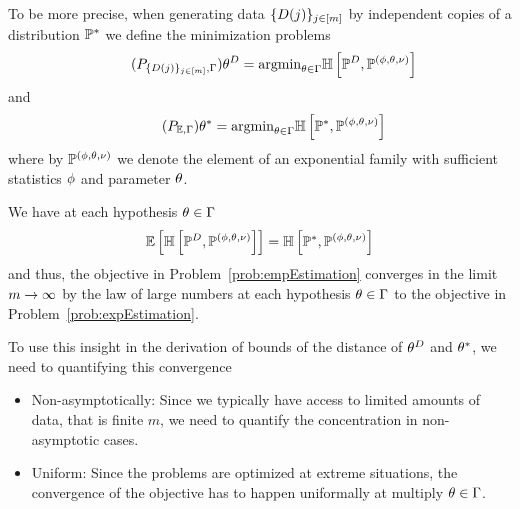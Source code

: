 %
To be more precise, when generating data $\{D(j)\}_{j\in[m]}$ by independent copies of a distribution $\mathbb{P}^*$ we define the minimization problems
\begin{align}\tag{$P_{\data,\canparamhypothesis}$}\label{prob:empEstimation}
	\empsolution = \argmin_{\canparamin} \centropyof{\empdistribution}{\stanexpdistof{\canparam}}
\end{align}
and
\begin{align}\tag{$P_{\mathbb{E},\canparamhypothesis}$}\label{prob:expEstimation}
	\expsolution = \argmin_{\canparamin} \centropyof{\gendistribution}{\stanexpdistof{\canparam}}
\end{align}
where by $\mathbb{P}^{(\phi,\theta,\nu)}$ we denote the element of an exponential family with sufficient statistics $\phi$ and parameter $\theta$.




We have at each hypothesis $\theta\in\Gamma$
\begin{align}
	\mathbb{E}\left[\mathbb{H}\left[\mathbb{P}^{D},\mathbb{P}^{(\phi,\theta,\nu)}\right]\right] = \mathbb{H}\left[\mathbb{P}^*,\mathbb{P}^{(\phi,\theta,\nu)}\right]
\end{align}
and thus, the objective in Problem~\ref{prob:empEstimation} converges in the limit $m\rightarrow\infty$ by the law of large numbers at each hypothesis $\theta\in\Gamma$ to the objective in Problem~\ref{prob:expEstimation}.

To use this insight in the derivation of bounds of the distance of $\theta^{D}$ and $\theta^*$, we need to quantifying this convergence 
\begin{itemize}
	\item Non-asymptotically: Since we typically have access to limited amounts of data, that is finite $m$, we need to quantify the concentration in non-asymptotic cases.
	\item Uniform: Since the problems are optimized at extreme situations, the convergence of the objective has to happen uniformally at multiply $\theta\in\Gamma$.
\end{itemize}


